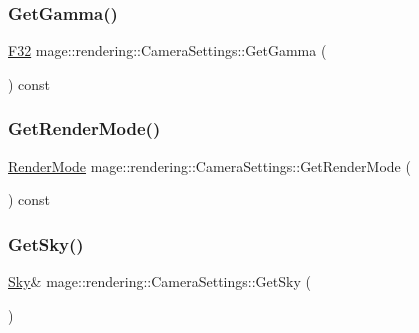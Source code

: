 \hypertarget{classmage_1_1rendering_1_1_camera_settings_ae99d9db32dcf8be886e324b647d90ade}{}\label{classmage_1_1rendering_1_1_camera_settings_ae99d9db32dcf8be886e324b647d90ade} 
\subsubsection{\texorpdfstring{Get\+Gamma()}{GetGamma()}}
{\footnotesize\ttfamily \hyperlink{namespacemage_aa97e833b45f06d60a0a9c4fc22ae02c0}{F32} mage\+::rendering\+::\+Camera\+Settings\+::\+Get\+Gamma (\begin{DoxyParamCaption}{ }\end{DoxyParamCaption}) const\hspace{0.3cm}{\ttfamily [noexcept]}}

\hypertarget{classmage_1_1rendering_1_1_camera_settings_ab1421b9c47b7eafbebd0619c5b5116b5}{}\label{classmage_1_1rendering_1_1_camera_settings_ab1421b9c47b7eafbebd0619c5b5116b5} 
\subsubsection{\texorpdfstring{Get\+Render\+Mode()}{GetRenderMode()}}
{\footnotesize\ttfamily \hyperlink{namespacemage_1_1rendering_aeb14ce7610cc9391f4e01be027b91dcc}{Render\+Mode} mage\+::rendering\+::\+Camera\+Settings\+::\+Get\+Render\+Mode (\begin{DoxyParamCaption}{ }\end{DoxyParamCaption}) const\hspace{0.3cm}{\ttfamily [noexcept]}}

\hypertarget{classmage_1_1rendering_1_1_camera_settings_a3538572fc79fa03380cb9ed8cceeba42}{}\label{classmage_1_1rendering_1_1_camera_settings_a3538572fc79fa03380cb9ed8cceeba42} 
\subsubsection{\texorpdfstring{Get\+Sky()}{GetSky()}\hspace{0.1cm}{\footnotesize\ttfamily [1/2]}}
{\footnotesize\ttfamily \hyperlink{classmage_1_1rendering_1_1_sky}{Sky}\& mage\+::rendering\+::\+Camera\+Settings\+::\+Get\+Sky (\begin{DoxyParamCaption}{ }\end{DoxyParamCaption})\hspace{0.3cm}{\ttfamily [noexcept]}}

